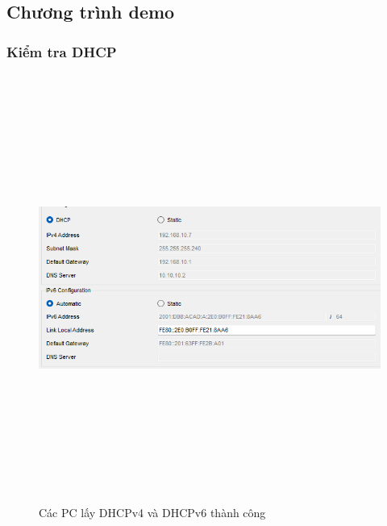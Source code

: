 \documentclass[a4paper, 12pt]{article}
\begin{document}
\subsection{Chương trình demo  }
\subsubsection{Kiểm tra DHCP}

\begin{figure}[H]
    \centering
    \includegraphics[width=16cm, height=14cm]{img/4.13.1a.png}
    \caption{Các PC lấy DHCPv4 và DHCPv6 thành công}
    \label{hinh4131a}
\end{figure}
\end{document}
